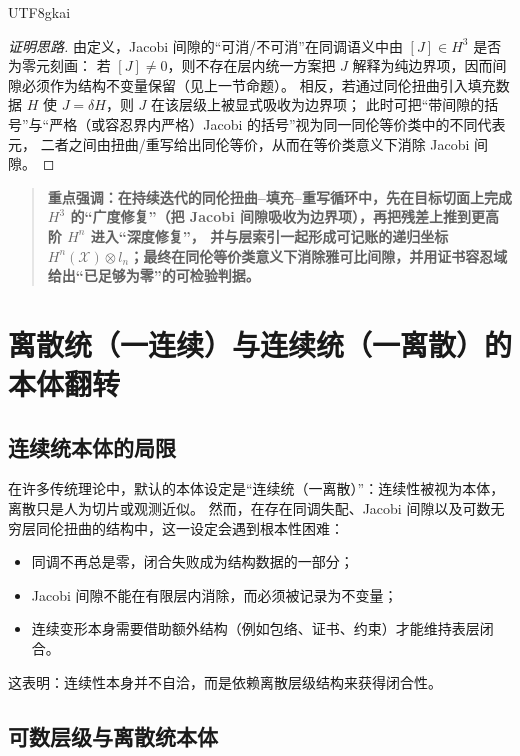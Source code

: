 \documentclass[12pt]{article}
\begin{document}
\begin{CJK*}{UTF8}{gkai}
\begin{proof}[证明思路]
由定义，Jacobi 间隙的“可消/不可消”在同调语义中由 $[J]\in H^3$ 是否为零元刻画：
若 $[J]\neq 0$，则不存在层内统一方案把 $J$ 解释为纯边界项，因而间隙必须作为结构不变量保留（见上一节命题）。
相反，若通过同伦扭曲引入填充数据 $H$ 使 $J=\delta H$，则 $J$ 在该层级上被显式吸收为边界项；
此时可把“带间隙的括号”与“严格（或容忍界内严格）Jacobi 的括号”视为同一同伦等价类中的不同代表元，
二者之间由扭曲/重写给出同伦等价，从而在等价类意义下消除 Jacobi 间隙。
\end{proof}

\begin{quote}
\textbf{重点强调：在持续迭代的同伦扭曲--填充--重写循环中，先在目标切面上完成 $H^3$ 的“广度修复”（把 Jacobi 间隙吸收为边界项），再把残差上推到更高阶 $H^n$ 进入“深度修复”，
  并与层索引一起形成可记账的递归坐标 $H^n(\mathcal X)\otimes l_n$；最终在同伦等价类意义下消除雅可比间隙，并用证书容忍域给出“已足够为零”的可检验判据。}
\end{quote}


\section{离散统（一连续）与连续统（一离散）的本体翻转}

\subsection{连续统本体的局限}

在许多传统理论中，默认的本体设定是“连续统（一离散）”：连续性被视为本体，离散只是人为切片或观测近似。
然而，在存在同调失配、Jacobi 间隙以及可数无穷层同伦扭曲的结构中，这一设定会遇到根本性困难：
\begin{itemize}
  \item 同调不再总是零，闭合失败成为结构数据的一部分；
  \item Jacobi 间隙不能在有限层内消除，而必须被记录为不变量；
  \item 连续变形本身需要借助额外结构（例如包络、证书、约束）才能维持表层闭合。
\end{itemize}

这表明：连续性本身并不自洽，而是依赖离散层级结构来获得闭合性。

\subsection{可数层级与离散统本体}


\end{CJK*}
\end{document}
